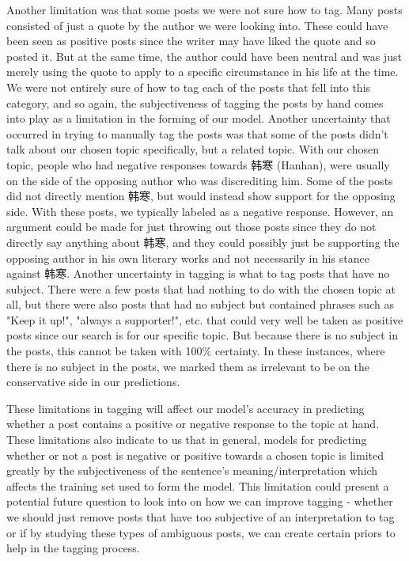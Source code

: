 \documentclass[11pt]{article}
\newcommand{\1}[1]{{\mathbf 1}\left\{#1\right\}}        %
\begin{document}
Another limitation was that some posts we were not sure how to tag. Many posts consisted of just a quote by the author we were looking into.  These could have been seen as positive posts since the writer may have liked the quote and so posted it. But at the same time, the author could have been neutral and was just merely using the quote to apply to a specific circumstance in his life at the time. We were not entirely sure of how to tag each of the posts that fell into this category, and so again, the subjectiveness of tagging the posts by hand comes into play as a limitation in the forming of our model.  Another uncertainty that occurred in trying to manually tag the posts was that some of the posts didn't talk about our chosen topic specifically, but a related topic.  With our chosen topic, people who had negative responses towards 韩寒 (Hanhan), were usually on the side of the opposing author who was discrediting him.  Some of the posts did not directly mention 韩寒, but would instead show support for the opposing side. With these posts, we typically labeled as a negative response.  However, an argument could be made for just throwing out those posts since they do not directly say anything about 韩寒, and they could possibly just be supporting the opposing author in his own literary works and not necessarily in his stance against 韩寒.  Another uncertainty in tagging is what to tag posts that have no subject.  There were a few posts that had nothing to do with the chosen topic at all, but there were also posts that had no subject but contained phrases such as "Keep it up!", "always a supporter!", etc. that could very well be taken as positive posts since our search is for our specific topic. But because there is no subject in the posts, this cannot be taken with 100\% certainty. In these instances, where there is no subject in the posts, we marked them as irrelevant to be on the conservative side in our predictions. 

These limitations in tagging will affect our model's accuracy in predicting whether a post contains a positive or negative response to the topic at hand.  These limitations also indicate to us that in general, models for predicting whether or not a post is negative or positive towards a chosen topic is limited greatly by the subjectiveness of the sentence's meaning/interpretation which affects the training set used to form the model. This limitation could present a potential future question to look into on how we can improve tagging - whether we should just remove posts that have too subjective of an interpretation to tag or if by studying these types of ambiguous posts, we can create certain priors to help in the tagging process. 
\end{document}
